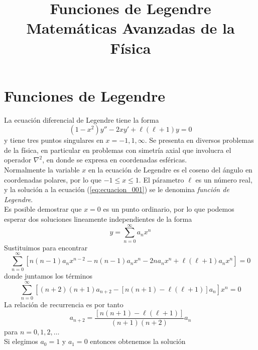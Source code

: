 
\usepackage{standalone}
\usepackage{tikz}   
\usepackage{tikz-3dplot}
\usepackage{mathrsfs}
\usepackage{bigints}
\title{Funciones de Legendre \\ {\large Matemáticas Avanzadas de la Física}}
\date{ }

\renewcommand\labelenumii{\theenumi.{\arabic{enumii}}}
\maketitle
\fontsize{14}{14}\selectfont
\section{Funciones de Legendre}
La ecuación diferencial de Legendre tiene la forma
\begin{equation}
(1-x^{2})y'' - 2xy' + \ell (\ell + 1) y = 0
\label{eq:ecuacion_001}
\end{equation}
y tiene tres puntos singulares en $x = -1, 1, \infty$. Se presenta en diversos problemas de la física, en particular en problemas con simetría axial que involucra el operador $\nabla^{2}$, en donde se expresa en coordenadas esféricas.
\\
Normalmente la variable $x$ en la ecuación de Legendre es el coseno del ángulo en coordenadas polares, por lo que $-1 \leq x \leq 1$. El párametro $\ell$ es un número real, y la solución a la ecuación (\ref{eq:ecuacion_001}) se le denomina \emph{función de Legendre}.
\\
Es posible demostrar que $x=0$ es un punto ordinario, por lo que podemos esperar dos soluciones lineamente independientes de la forma
\[ y = \sum_{n=0}^{\infty} a_{n} x^{n} \]
Sustituimos para encontrar
\[ \sum_{n=0}^{\infty} \left[ n (n-1) a_{n} x^{n-2} - n (n-1) a_{n} x^{n} - 2n a_{n} x^{n} + \ell (\ell + 1) a_{n} x^{n} \right] = 0 \]
donde juntamos los términos
\[ \sum_{n=0}^{\infty} \left[ (n+2)(n+1) a_{n+2} - [ n(n+1) - \ell (\ell + 1) ] a_{n} \right] x^{n} = 0 \]
La relación de recurrencia es por tanto
\begin{equation}
a_{n+2} = \dfrac{[n(n+1)- \ell ( \ell + 1)]}{(n+1)(n+2)} a_{n}
\label{eq:ecuacion_002}
\end{equation}
para $n=0,1,2,\ldots$
\\
Si elegimos $a_{0} = 1$ y $a_{1} = 0$ entonces obtenemos la solución
